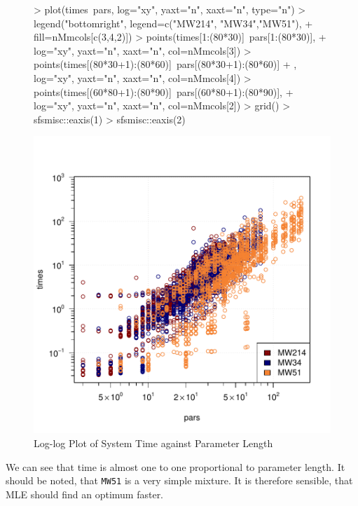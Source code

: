 \begin{figure}[h!]
    \begin{Rgraph}[0.9]
\begin{Schunk}
\begin{Sinput}
>     plot(times~pars, log="xy", yaxt="n", xaxt="n", type="n")
>     legend("bottomright", legend=c("MW214", "MW34","MW51"),
+            fill=nMmcols[c(3,4,2)])
>     points(times[1:(80*30)]~pars[1:(80*30)], 
+            log="xy", yaxt="n", xaxt="n", col=nMmcols[3])
>     points(times[(80*30+1):(80*60)]~pars[(80*30+1):(80*60)]
+            , log="xy", yaxt="n", xaxt="n", col=nMmcols[4])
>     points(times[(60*80+1):(80*90)]~pars[(60*80+1):(80*90)], 
+            log="xy", yaxt="n", xaxt="n", col=nMmcols[2])
>     grid()
>     sfsmisc::eaxis(1)
>     sfsmisc::eaxis(2)
\end{Sinput}
\end{Schunk}
\includegraphics{chapter3-figtime}
    \caption{Log-log Plot of System Time against Parameter Length}
    \label{fig:time}
    \end{Rgraph}
\end{figure}

We can see that time is almost one to one proportional to parameter length.
It should be noted, that {\tt MW51} is a very simple mixture. It is therefore 
sensible, that MLE should find an optimum faster.

